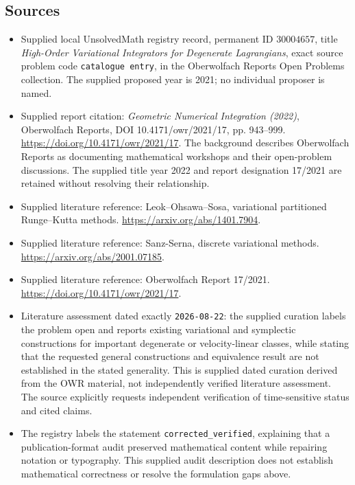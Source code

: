 \documentclass[11pt]{article}
\begin{document}
\subsection{Sources}
\begin{itemize}
\item Supplied local UnsolvedMath registry record, permanent ID \(30004657\), title \emph{High-Order Variational Integrators for Degenerate Lagrangians}, exact source problem code \texttt{catalogue entry}, in the Oberwolfach Reports Open Problems collection. The supplied proposed year is 2021; no individual proposer is named.
\item Supplied report citation: \emph{Geometric Numerical Integration (2022)}, Oberwolfach Reports, DOI 10.4171/owr/2021/17, pp. 943--999. \url{https://doi.org/10.4171/owr/2021/17}. The background describes Oberwolfach Reports as documenting mathematical workshops and their open-problem discussions. The supplied title year 2022 and report designation 17/2021 are retained without resolving their relationship.
\item Supplied literature reference: Leok--Ohsawa--Sosa, variational partitioned Runge--Kutta methods. \url{https://arxiv.org/abs/1401.7904}.
\item Supplied literature reference: Sanz-Serna, discrete variational methods. \url{https://arxiv.org/abs/2001.07185}.
\item Supplied literature reference: Oberwolfach Report 17/2021. \url{https://doi.org/10.4171/owr/2021/17}.
\item Literature assessment dated exactly \texttt{2026-08-22}: the supplied curation labels the problem open and reports existing variational and symplectic constructions for important degenerate or velocity-linear classes, while stating that the requested general constructions and equivalence result are not established in the stated generality. This is supplied dated curation derived from the OWR material, not independently verified literature assessment. The source explicitly requests independent verification of time-sensitive status and cited claims.
\item The registry labels the statement \texttt{corrected\_verified}, explaining that a publication-format audit preserved mathematical content while repairing notation or typography. This supplied audit description does not establish mathematical correctness or resolve the formulation gaps above.
\end{itemize}
\end{document}
